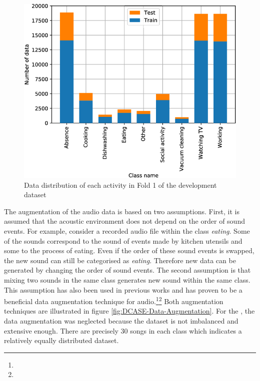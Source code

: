 \begin{figure}[htbp]
	\centering
	\includegraphics[scale=0.35]{img/DCASE_unbalanced.png}
	\caption[Data distribution of each activity in Fold 1 of the development dataset]{Data distribution of each activity in Fold 1 of the development dataset \footnotemark}
	\label{fig:DCASE-Unbalanced}
\end{figure}
\noindent
\newline
\newline
The augmentation of the audio data is based on two assumptions. First, it is assumed that the acoustic environment does not depend on the order of sound events. For example, consider a recorded audio file within the class \textit{eating}. Some of the sounds correspond to the sound of events made by kitchen utensils and some to the process of eating. Even if the order of these sound events is swapped, the new sound can still be categorised as \textit{eating}. Therefore new data can be generated by changing the order of sound events. The second assumption is that mixing two sounds in the same class generates new sound within the same class. This assumption has also been used in previous works and has proven to be a beneficial data augmentation technique for audio.\footnote{}\footnote{} Both augmentation techniques are illustrated in figure \ref{fig:DCASE-Data-Augmentation}.
\newline
\newline
For the , the data augmentation was neglected because the dataset is not imbalanced and extensive enough. There are precisely 30 songs in each class which indicates a relatively equally distributed dataset.
